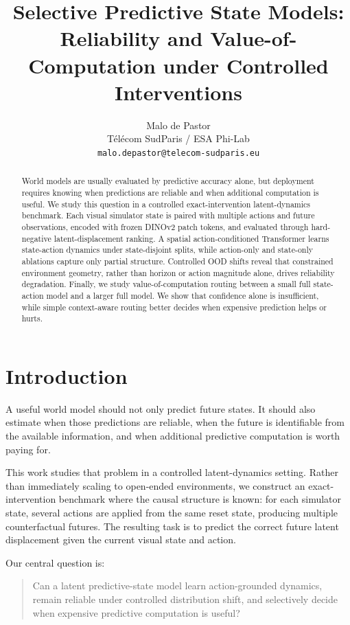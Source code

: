 \documentclass[10pt]{article}
\title{
Selective Predictive State Models: \\
Reliability and Value-of-Computation under Controlled Interventions
}
\author{
Malo de Pastor \\
Télécom SudParis / ESA Phi-Lab \\
\texttt{malo.depastor@telecom-sudparis.eu}
}
\date{}
\begin{document}
\maketitle

\begin{abstract}
World models are usually evaluated by predictive accuracy alone, but deployment requires knowing when predictions are reliable and when additional computation is useful.
We study this question in a controlled exact-intervention latent-dynamics benchmark.
Each visual simulator state is paired with multiple actions and future observations, encoded with frozen DINOv2 patch tokens, and evaluated through hard-negative latent-displacement ranking.
A spatial action-conditioned Transformer learns state-action dynamics under state-disjoint splits, while action-only and state-only ablations capture only partial structure.
Controlled OOD shifts reveal that constrained environment geometry, rather than horizon or action magnitude alone, drives reliability degradation.
Finally, we study value-of-computation routing between a small full state-action model and a larger full model.
We show that confidence alone is insufficient, while simple context-aware routing better decides when expensive prediction helps or hurts.
\end{abstract}

\section{Introduction}

A useful world model should not only predict future states.
It should also estimate when those predictions are reliable, when the future is identifiable from the available information, and when additional predictive computation is worth paying for.

This work studies that problem in a controlled latent-dynamics setting.
Rather than immediately scaling to open-ended environments, we construct an exact-intervention benchmark where the causal structure is known: for each simulator state, several actions are applied from the same reset state, producing multiple counterfactual futures.
The resulting task is to predict the correct future latent displacement given the current visual state and action.

Our central question is:

\begin{quote}
Can a latent predictive-state model learn action-grounded dynamics, remain reliable under controlled distribution shift, and selectively decide when expensive predictive computation is useful?
\end{quote}
\end{document}
